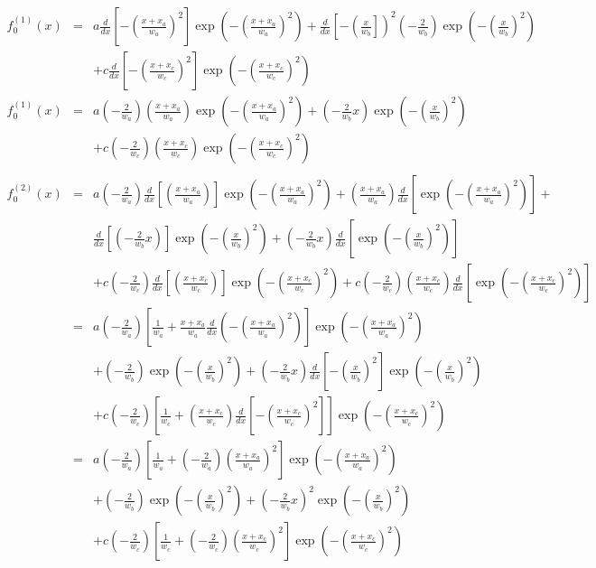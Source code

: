 \documentclass[11pt]{article}
\begin{document}
\begin{eqnarray*}
f^{(1)}_0(x) & = & a\frac{d}{dx}\left[-\left(\frac{x + x_a}{w_a}\right)^2\right]\exp(-\left(\frac{x + x_a}{w_a}\right)^2) + \frac{d}{dx}\left[-\left(\frac{x}{w_b}\right]\right)^2\left(-\frac{2}{w_b}\right)\exp(-\left(\frac{x}{w_b}\right)^2) \\
& & + c\frac{d}{dx}\left[-\left(\frac{x + x_c}{w_c}\right)^2\right]\exp(-(\frac{x + x_c}{w_c})^2) \\[2em]
f^{(1)}_0(x) & = &  a\left(-\frac{2}{w_a}\right)\left(\frac{x + x_a}{w_a}\right)\exp(-\left(\frac{x + x_a}{w_a}\right)^2) + \left(-\frac{2}{w_b}x \right)\exp(-\left(\frac{x}{w_b}\right)^2) \\[2em]
& & + c\left(-\frac{2}{w_c}\right)\left(\frac{x + x_c}{w_c}\right)\exp(-(\frac{x + x_c}{w_c})^2) \\[3em]
\end{eqnarray*}
\begin{eqnarray*}
f^{(2)}_0(x) & = &  a\left(-\frac{2}{w_a}\right)\frac{d}{dx}\left[\left(\frac{x + x_a}{w_a}\right)\right]\exp(-\left(\frac{x + x_a}{w_a}\right)^2) + \left(\frac{x + x_a}{w_a}\right)\frac{d}{dx}\left[\exp(-\left(\frac{x + x_a}{w_a}\right)^2)\right] + \\[3em]
& & \frac{d}{dx}\left[\left(-\frac{2}{w_b}x \right)\right]\exp(-\left(\frac{x}{w_b}\right)^2) + \left(-\frac{2}{w_b}x \right)\frac{d}{dx}\left[\exp(-\left(\frac{x}{w_b}\right)^2)\right]  \\[3em]
& & + c\left(-\frac{2}{w_c}\right)\frac{d}{dx}\left[\left(\frac{x + x_c}{w_c}\right)\right]\exp(-(\frac{x + x_c}{w_c})^2) + c\left(-\frac{2}{w_c}\right)\left(\frac{x + x_c}{w_c}\right)\frac{d}{dx}\left[\exp(-(\frac{x + x_c}{w_c})^2)\right] \\[3em]
& = & a\left(-\frac{2}{w_a}\right)\left[\frac{1}{w_a} + \frac{x + x_a}{w_a}\frac{d}{dx}\left(-\left(\frac{x + x_a}{w_a}\right)^2\right)\right]\exp(-\left(\frac{x + x_a}{w_a}\right)^2) \\[3em]
&  & + \left(-\frac{2}{w_b}\right)\exp(-\left(\frac{x}{w_b}\right)^2) + \left(-\frac{2}{w_b}x\right)\frac{d}{dx}\left[-\left(\frac{x}{w_b}\right)^2\right]\exp(-\left(\frac{x}{w_b}\right)^2) \\[3em] 
&&+ c\left(-\frac{2}{w_c}\right)\left[\frac{1}{w_c} + \left(\frac{x + x_c}{w_c}\right)\frac{d}{dx}\left[-(\frac{x + x_c}{w_c})^2\right]\right]\exp(-(\frac{x + x_c}{w_c})^2) \\[3em]
& = & a\left(-\frac{2}{w_a}\right)\left[\frac{1}{w_a} + \left(-\frac{2}{w_a}\right)\left(\frac{x + x_a}{w_a}\right)^2\right]\exp(-\left(\frac{x + x_a}{w_a}\right)^2) \\[3em]
&  & + \left(-\frac{2}{w_b}\right)\exp(-\left(\frac{x}{w_b}\right)^2) + \left(-\frac{2}{w_b}x\right)^2\exp(-\left(\frac{x}{w_b}\right)^2) \\[3em]
&&+ c\left(-\frac{2}{w_c}\right)\left[\frac{1}{w_c} + \left(-\frac{2}{w_c}\right)\left(\frac{x + x_c}{w_c}\right)^2\right]\exp(-(\frac{x + x_c}{w_c})^2)
\end{eqnarray*}
\end{document}
